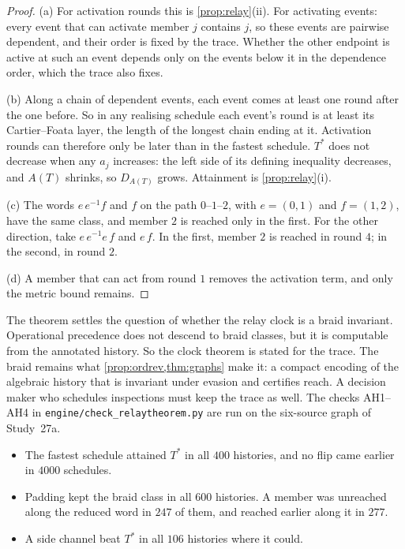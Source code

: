 \documentclass[11pt]{article}
\theoremstyle{definition}\newtheorem{definition}[theorem]{Definition}\newtheorem{remark}[theorem]{Remark}\newtheorem{example}[theorem]{Example}\newtheorem{problem}[theorem]{Open problem}\crefname{problem}{Problem}{Problems}
\begin{document}
\begin{proof}
(a) For activation rounds this is \cref{prop:relay}(ii). For activating events: every event that can activate member $j$ contains $j$, so these events are pairwise dependent, and their order is fixed by the trace. Whether the other endpoint is active at such an event depends only on the events below it in the dependence order, which the trace also fixes.

(b) Along a chain of dependent events, each event comes at least one round after the one before. So in any realising schedule each event's round is at least its Cartier--Foata layer, the length of the longest chain ending at it. Activation rounds can therefore only be later than in the fastest schedule. $T^\ast$ does not decrease when any $a_j$ increases: the left side of its defining inequality decreases, and $A(T)$ shrinks, so $D_{A(T)}$ grows. Attainment is \cref{prop:relay}(i).

(c) The words $e\,e^{-1}f$ and $f$ on the path $0$--$1$--$2$, with $e=(0,1)$ and $f=(1,2)$, have the same class, and member $2$ is reached only in the first. For the other direction, take $e\,e^{-1}e\,f$ and $e\,f$. In the first, member $2$ is reached in round $4$; in the second, in round $2$.

(d) A member that can act from round $1$ removes the activation term, and only the metric bound remains.
\end{proof}

The theorem settles the question of whether the relay clock is a braid invariant. Operational precedence does not descend to braid classes, but it is computable from the annotated history. So the clock theorem is stated for the trace. The braid remains what \cref{prop:ordrev,thm:graphs} make it: a compact encoding of the algebraic history that is invariant under evasion and certifies reach. A decision maker who schedules inspections must keep the trace as well. The checks AH1--AH4 in \texttt{engine/check\_relaytheorem.py} are run on the six-source graph of Study~27a.
\begin{itemize}
\item The fastest schedule attained $T^\ast$ in all $400$ histories, and no flip came earlier in $4000$ schedules.
\item Padding kept the braid class in all $600$ histories. A member was unreached along the reduced word in $247$ of them, and reached earlier along it in $277$.
\item A side channel beat $T^\ast$ in all $106$ histories where it could.
\end{itemize}
\end{document}
